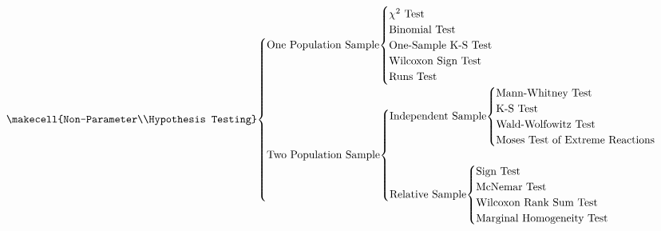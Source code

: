 \begin{equation*}
    \text{\makecell{Non-Parameter\\Hypothesis Testing}}
    \smash[htbp]{
    \begin{cases}
        \text{One Population Sample}
            \smash[t]{
                \begin{cases}
                    \chi^2\text{ Test}\\
                    \text{Binomial Test}\\
                    \text{One-Sample K-S Test}\\
                    \text{Wilcoxon Sign Test}\\
                    \text{Runs Test}
                \end{cases}
            }\\
            \\
            \\
            \\
            \\
        \text{Two Population Sample}
            \smash[t]{
                \begin{cases}
                    \text{Independent Sample}
                    \smash[t]{
                        \begin{cases}
                            \text{Mann-Whitney Test}\\
                            \text{K-S Test}\\
                            \text{Wald-Wolfowitz Test}\\
                            \text{Moses Test of Extreme Reactions}
                        \end{cases}
                    }\\
                    \\
                    \text{Relative Sample}
                    \smash[b]{
                        \begin{cases}
                            \text{Sign Test}\\
                            \text{McNemar Test}\\
                            \text{Wilcoxon Rank Sum Test}\\
                            \text{Marginal Homogeneity Test}
                        \end{cases}
                    }
                \end{cases}
            }\\

\end{cases}}
\end{equation*}
